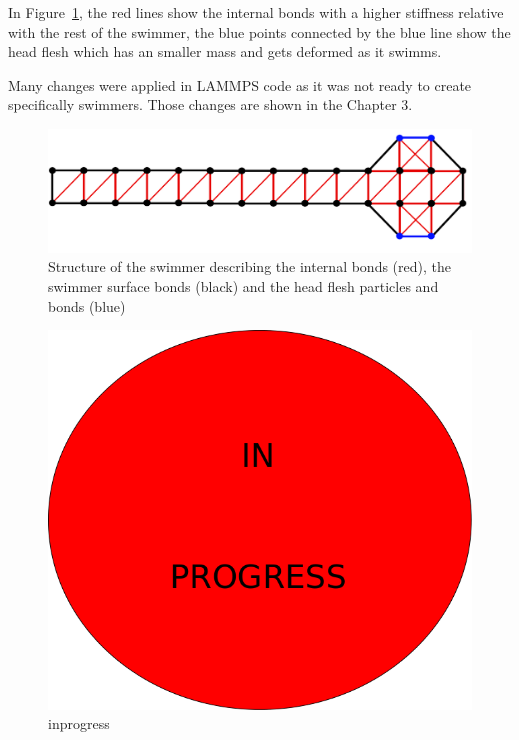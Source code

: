 In Figure~\ref{fig:Bild2.7}, the red lines show the internal bonds with a higher stiffness relative with the rest of the swimmer, the blue points connected by the blue line show the 
head flesh which has an smaller mass and gets deformed as it swimms.\par
Many changes were applied in LAMMPS code as it was not ready to create specifically swimmers. Those changes are shown in the Chapter 3.


\begin{figure}[ht]
\centering
  \begin{footnotesize}
  \includegraphics[scale=0.25]{images/swimmer-compare.png}
  \caption[Structure of the swimmer describing the internal bonds (red), the swimmer surface bonds (black) and the head flesh particles and bonds(blue)]{Structure of the swimmer describing the internal bonds (red), the swimmer surface bonds (black) and the head flesh particles and bonds (blue)}
  \label{fig:Bild2.7}
  \end{footnotesize}
\end{figure} 










\begin{figure}
\centering
  \begin{footnotesize}
  \includegraphics[scale=0.25]{images/in-progress.png}
  \caption[inprogress]{inprogress}
  \label{fig:Bild100}
  \end{footnotesize}
\end{figure} 


